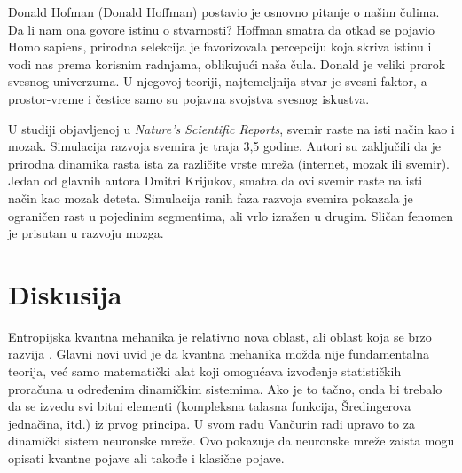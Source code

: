 \documentclass[a4paper]{article}
\begin{document}
Donald Hofman (Donald Hoffman) postavio je osnovno pitanje o našim čulima. Da li nam ona govore istinu o stvarnosti? Hoffman smatra da otkad se pojavio Homo sapiens, prirodna selekcija je favorizovala percepciju koja skriva istinu i vodi nas prema korisnim radnjama, oblikujući naša čula. Donald je veliki prorok svesnog univerzuma. U njegovoj teoriji, najtemeljnija stvar je svesni faktor, a prostor-vreme i čestice samo su pojavna svojstva svesnog iskustva. 

U studiji objavljenoj u \textit{Nature’s Scientific Reports}, svemir raste na isti način kao i mozak. Simulacija razvoja svemira je traja 3,5 godine. Autori su zaključili da je prirodna dinamika rasta ista za različite vrste mreža (internet, mozak ili svemir). Jedan od glavnih autora Dmitri Krijukov, smatra da ovi svemir raste na isti način kao mozak deteta. Simulacija ranih faza razvoja svemira pokazala je ograničen rast u pojedinim segmentima, ali vrlo izražen u drugim. Sličan fenomen je prisutan u razvoju mozga. 

\section{Diskusija}
Entropijska kvantna mehanika je relativno nova \cite{4} oblast, ali oblast koja se brzo razvija \cite{5}. Glavni novi uvid je da kvantna mehanika možda nije fundamentalna teorija, već samo matematički alat koji omogućava izvođenje statističkih proračuna u određenim dinamičkim sistemima. Ako je to tačno, onda bi trebalo da se izvedu svi bitni elementi (kompleksna talasna funkcija, Šredingerova jednačina, itd.) iz prvog principa. U svom radu Vančurin radi upravo to za dinamički sistem neuronske mreže. Ovo pokazuje da neuronske mreže zaista mogu opisati kvantne pojave ali takođe i klasične pojave. 
\end{document}
